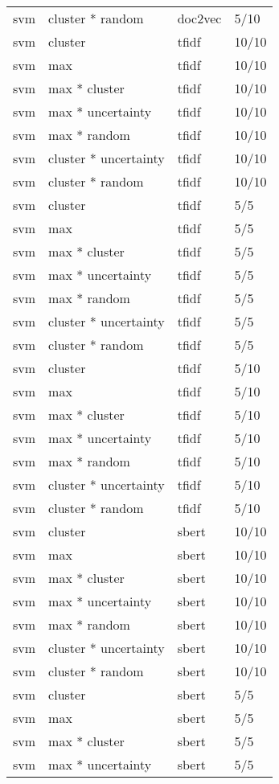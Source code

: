 \documentclass[12pt,twoside]{reedthesis}
\begin{document}
\begin{longtable}{llll}
\addlinespace
svm & cluster * random & doc2vec & 5/10\\
svm & cluster & tfidf & 10/10\\
svm & max & tfidf & 10/10\\
svm & max * cluster & tfidf & 10/10\\
svm & max * uncertainty & tfidf & 10/10\\
\addlinespace
svm & max * random & tfidf & 10/10\\
svm & cluster * uncertainty & tfidf & 10/10\\
svm & cluster * random & tfidf & 10/10\\
svm & cluster & tfidf & 5/5\\
svm & max & tfidf & 5/5\\
\addlinespace
svm & max * cluster & tfidf & 5/5\\
svm & max * uncertainty & tfidf & 5/5\\
svm & max * random & tfidf & 5/5\\
svm & cluster * uncertainty & tfidf & 5/5\\
svm & cluster * random & tfidf & 5/5\\
\addlinespace
svm & cluster & tfidf & 5/10\\
svm & max & tfidf & 5/10\\
svm & max * cluster & tfidf & 5/10\\
svm & max * uncertainty & tfidf & 5/10\\
svm & max * random & tfidf & 5/10\\
\addlinespace
svm & cluster * uncertainty & tfidf & 5/10\\
svm & cluster * random & tfidf & 5/10\\
svm & cluster & sbert & 10/10\\
svm & max & sbert & 10/10\\
svm & max * cluster & sbert & 10/10\\
\addlinespace
svm & max * uncertainty & sbert & 10/10\\
svm & max * random & sbert & 10/10\\
svm & cluster * uncertainty & sbert & 10/10\\
svm & cluster * random & sbert & 10/10\\
svm & cluster & sbert & 5/5\\
\addlinespace
svm & max & sbert & 5/5\\
svm & max * cluster & sbert & 5/5\\
svm & max * uncertainty & sbert & 5/5\\

\end{longtable}
\end{document}
